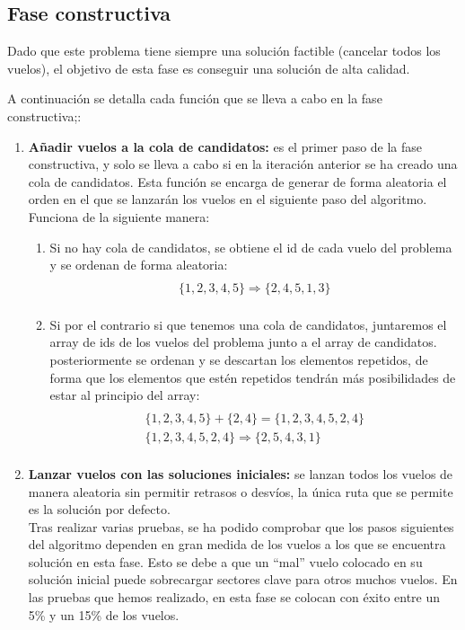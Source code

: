 \subsection{Fase constructiva}
Dado que este problema tiene siempre una solución factible (cancelar todos los vuelos), el objetivo de esta fase es conseguir una solución de alta calidad. 

A continuación se detalla cada función que se lleva a cabo en la fase constructiva;:
\begin{enumerate}
	
	\item \textbf{Añadir vuelos a la cola de candidatos:} es el primer paso de la fase constructiva, y solo se lleva a cabo si en la iteración anterior se ha creado una cola de candidatos. Esta función se encarga de generar de forma aleatoria el orden en el que se lanzarán los vuelos en el siguiente paso del algoritmo. Funciona de la siguiente manera:
	\begin{enumerate}
		\item Si no hay cola de candidatos, se obtiene el id de cada vuelo del problema y se ordenan de forma aleatoria:
		\begin{multline}\\
			\{1,2,3,4,5\} \Rightarrow \{2,4,5,1,3\}\\
		\end{multline}
		\item Si por el contrario si que tenemos una cola de candidatos, juntaremos el array de ids de los vuelos del problema junto a el array de candidatos. posteriormente se ordenan y se descartan los elementos repetidos, de forma que los elementos que estén repetidos tendrán más posibilidades de estar al principio del array:
		\begin{multline}\\
		\{1,2,3,4,5\} + \{2,4\} = \{1,2,3,4,5,2,4\} \\
		\{1,2,3,4,5,2,4\} \Rightarrow \{2,5,4,3,1\}  \\ 
		\end{multline}
	\end{enumerate}
	
	\item \textbf{Lanzar vuelos con las soluciones iniciales: }se lanzan todos los vuelos de manera aleatoria sin permitir retrasos o desvíos, la única ruta que se permite es la solución por defecto.\\
	Tras realizar varias pruebas, se ha podido comprobar que los pasos siguientes del algoritmo dependen en gran medida de los vuelos a los que se encuentra solución en esta fase. Esto se debe a que un ``mal'' vuelo colocado en su solución inicial puede sobrecargar sectores clave para otros muchos vuelos. En las pruebas que hemos realizado, en esta fase se colocan con éxito entre un 5\% y un 15\% de los vuelos.
	

\end{enumerate}
